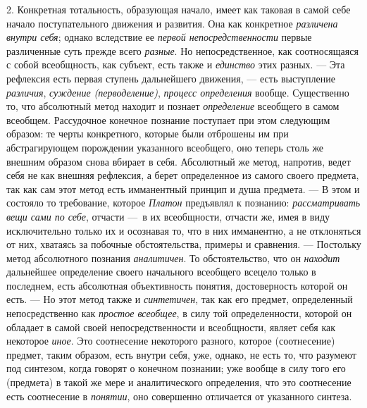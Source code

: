 \documentclass[twoside]{article}
\begin{document}
2. Конкретная тотальность, образующая начало, имеет как
таковая в самой себе начало поступательного движения и развития. Она как
конкретное {\em различена внутри себя};
однако вследствие ее
{\em первой непосредственности}
первые различенные суть прежде всего
{\em разные}. Но
непосредственное, как соотносящаяся с собой всеобщность, как субъект, есть
также и {\em единство}
этих разных. — Эта рефлексия есть первая
ступень дальнейшего движения, — есть выступление
{\em различия},
{\em суждение (перводеление)},
{\em процесс определения}
вообще. Существенно то, что абсолютный метод находит и
познает {\em определение}
всеобщего в самом всеобщем. Рассудочное конечное познание
поступает при этом следующим образом: те черты конкретного, которые были
отброшены им при абстрагирующем порождении указанного всеобщего, оно теперь
столь же внешним образом снова вбирает в себя. Абсолютный же метод,
напротив, ведет себя не как внешняя рефлексия, а берет определенное из
самого своего предмета, так как сам этот метод есть имманентный принцип и
душа предмета. — В этом и состояло то
требование, которое {\em Платон}
предъявлял к познанию:
{\em рассматривать вещи сами по себе},
отчасти —~в их всеобщности, отчасти же, имея в
виду исключительно только их и осознавая то, что в них имманентно, а не
отклоняться от них, хватаясь за побочные обстоятельства, примеры и
сравнения. — Постольку метод абсолютного познания
{\em аналитичен}. То
обстоятельство, что он {\em находит}
дальнейшее определение своего начального всеобщего всецело
только в последнем, есть абсолютная объективность понятия, достоверность
которой он есть. — \label{bkm:bmpg224a}Но этот метод также и
{\em синтетичен}, так как
его предмет, определенный непосредственно как
{\em простое всеобщее}, в
силу той определенности, которой он обладает в самой своей
непосредственности и всеобщности, являет себя как некоторое
{\em иное}. Это
соотнесение некоторого разного, которое (соотнесение) предмет, таким
образом, есть внутри себя, уже, однако, не есть то, что разумеют под
синтезом, когда говорят о конечном познании; уже вообще в силу того его
(предмета) в такой же мере и аналитического определения, что это
соотнесение есть соотнесение в
{\em понятии}, оно
совершенно отличается от указанного синтеза.
\end{document}
